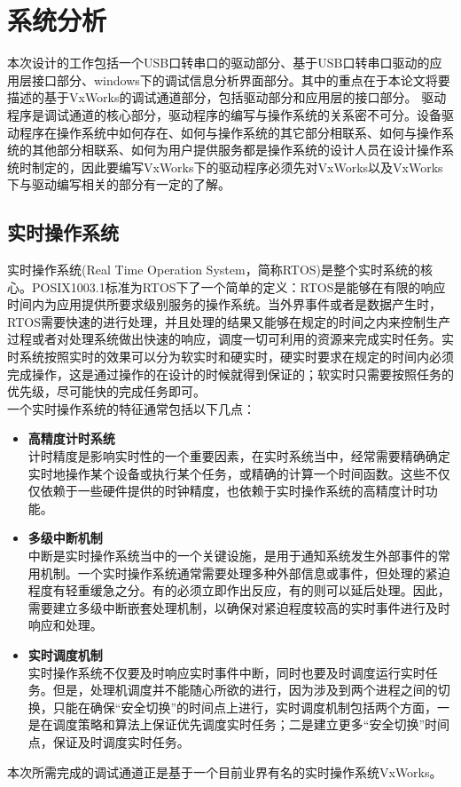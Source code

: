 \chapter{系统分析}
	本次设计的工作包括一个USB口转串口的驱动部分、基于USB口转串口驱动的应用层接口部分、windows下的调试信息分析界面部分。其中的重点在于本论文将要描述的基于VxWorks的调试通道部分，包括驱动部分和应用层的接口部分。
	驱动程序是调试通道的核心部分，驱动程序的编写与操作系统的关系密不可分。设备驱动程序在操作系统中如何存在、如何与操作系统的其它部分相联系、如何与操作系统的其他部分相联系、如何为用户提供服务都是操作系统的设计人员在设计操作系统时制定的，因此要编写VxWorks下的驱动程序必须先对VxWorks以及VxWorks下与驱动编写相关的部分有一定的了解。
	
\section{实时操作系统}
	实时操作系统(Real Time Operation System，简称RTOS)是整个实时系统的核心。POSIX1003.1标准为RTOS下了一个简单的定义：RTOS是能够在有限的响应时间内为应用提供所要求级别服务的操作系统\cite{Renard20081003}。当外界事件或者是数据产生时，RTOS需要快速的进行处理，并且处理的结果又能够在规定的时间之内来控制生产过程或者对处理系统做出快速的响应，调度一切可利用的资源来完成实时任务。实时系统按照实时的效果可以分为软实时和硬实时，硬实时要求在规定的时间内必须完成操作，这是通过操作的在设计的时候就得到保证的；软实时只需要按照任务的优先级，尽可能快的完成任务即可。\\
一个实时操作系统的特征通常包括以下几点：
\begin{itemize}
\item \textbf{高精度计时系统}\\
	计时精度是影响实时性的一个重要因素，在实时系统当中，经常需要精确确定实时地操作某个设备或执行某个任务，或精确的计算一个时间函数。这些不仅仅依赖于一些硬件提供的时钟精度，也依赖于实时操作系统的高精度计时功能。
\item \textbf{多级中断机制}\\
	中断是实时操作系统当中的一个关键设施，是用于通知系统发生外部事件的常用机制。一个实时操作系统通常需要处理多种外部信息或事件，但处理的紧迫程度有轻重缓急之分。有的必须立即作出反应，有的则可以延后处理。因此，需要建立多级中断嵌套处理机制，以确保对紧迫程度较高的实时事件进行及时响应和处理。
\item \textbf{实时调度机制}\\
	实时操作系统不仅要及时响应实时事件中断，同时也要及时调度运行实时任务。但是，处理机调度并不能随心所欲的进行，因为涉及到两个进程之间的切换，只能在确保“安全切换”的时间点上进行，实时调度机制包括两个方面，一是在调度策略和算法上保证优先调度实时任务；二是建立更多“安全切换”时间点，保证及时调度实时任务。
\end{itemize}
本次所需完成的调试通道正是基于一个目前业界有名的实时操作系统VxWorks。

